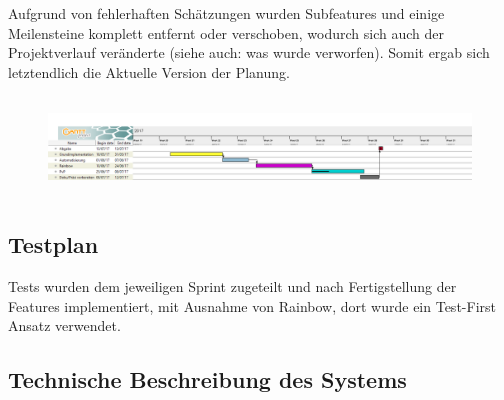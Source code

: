 \documentclass[12pt]{article}
\theoremstyle{plain}
\begin{document}
Aufgrund von fehlerhaften Schätzungen wurden Subfeatures und einige Meilensteine komplett entfernt oder verschoben, wodurch sich auch der Projektverlauf veränderte (siehe auch: was wurde verworfen). Somit ergab sich letztendlich die Aktuelle Version der Planung.
\begin{figure}[ht]
\centering
\includegraphics[width=1\textwidth, height=100px]{images/gant.png}
\end{figure}

\subsection{Testplan}
Tests wurden dem jeweiligen Sprint zugeteilt und nach Fertigstellung der Features implementiert,
mit Ausnahme von Rainbow, dort wurde ein Test-First Ansatz verwendet.

\subsection{Technische Beschreibung des Systems}
\end{document}
